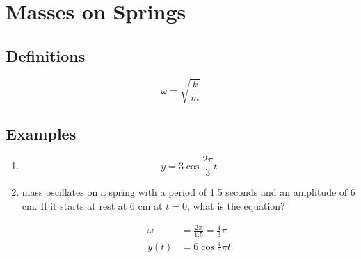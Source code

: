\documentclass{exam}
\begin{document}
  \section{Masses on Springs}
  \subsection{Definitions}
  \[
    \omega = \sqrt{\frac{k}{m}}
  \]
          
  \subsection{Examples}
  \begin{enumerate}
    \item 
      \[
        y = 3 \cos \frac{2 \pi}{3} t
      \]

    \item mass oscillates on a spring with a period of 1.5 seconds and an amplitude of 6 cm.  
      If it starts at rest at 6 cm at $t = 0$, what is the equation?

      \begin{solution}
        \begin{align*}
          \omega & = \frac{2 \pi}{1.5} = \frac{4}{3} \pi \\
          y(t)   & = 6 \cos \frac{4}{3} \pi t \\
        \end{align*}
      \end{solution}


\end{enumerate}
\end{document}
